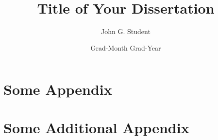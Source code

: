 \documentclass{thesis}
\title{Title of Your Dissertation}                                      %
\author{John G. Student}                                                %
\date{Grad-Month Grad-Year}                                                      %
\begin{document}
	



	




\subappendix{}{%
    \label{chap4:app}
    
}




\begin{appendices}
    \chapter{Some Appendix}\label{app:a}
    
    \chapter{Some Additional Appendix}\label{app:b}
    
\end{appendices}
\end{document}
